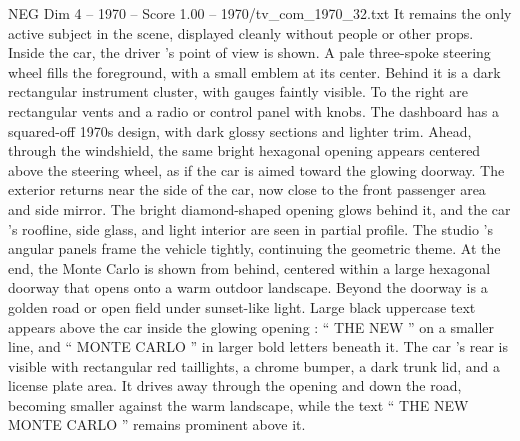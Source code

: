 \begin{textsample}{NEG Dim 4 – 1970 – Score 1.00 – 1970/tv\_com\_1970\_32.txt}
It remains the only active subject in the scene, displayed cleanly without people or other props.
Inside the car, the driver ’s point of view is shown.
A pale three-spoke steering wheel fills the foreground, with a small emblem at its center.
Behind it is a dark rectangular instrument cluster, with gauges faintly visible.
To the right are rectangular vents and a radio or control panel with knobs.
The dashboard has a squared-off 1970s design, with dark glossy sections and lighter trim.
Ahead, through the windshield, the same bright hexagonal opening appears centered above the steering wheel, as if the car is aimed toward the glowing doorway.
The exterior returns near the side of the car, now close to the front passenger area and side mirror.
The bright diamond-shaped opening glows behind it, and the car ’s roofline, side glass, and light interior are seen in partial profile.
The studio ’s angular panels frame the vehicle tightly, continuing the geometric theme.
At the end, the Monte Carlo is shown from behind, centered within a large hexagonal doorway that opens onto a warm outdoor landscape.
Beyond the doorway is a golden road or open field under sunset-like light.
Large black uppercase text appears above the car inside the glowing opening : “ THE NEW ” on a smaller line, and “ MONTE CARLO ” in larger bold letters beneath it.
The car ’s rear is visible with rectangular red taillights, a chrome bumper, a dark trunk lid, and a license plate area.
It drives away through the opening and down the road, becoming smaller against the warm landscape, while the text “ THE NEW MONTE CARLO ” remains prominent above it.

\end{textsample}
